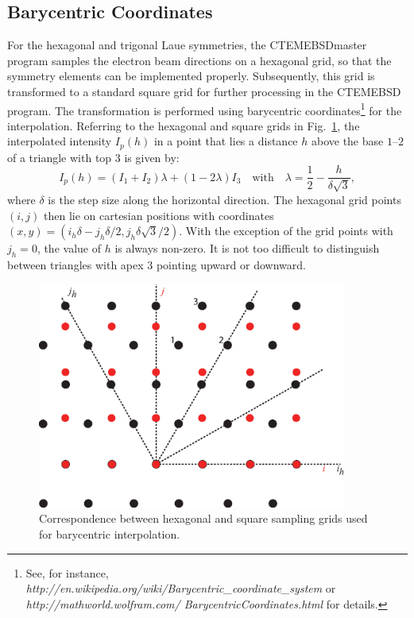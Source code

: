 \documentclass[DIV=calc, paper=letter, fontsize=11pt]{scrartcl}	 %
\begin{document}
\subsection{Barycentric Coordinates \label{sec:barycentric}}
For the hexagonal and trigonal Laue symmetries, the \textsf{CTEMEBSDmaster} program samples the electron beam directions on 
a hexagonal grid, so that the symmetry elements can be implemented properly.  Subsequently, this grid is transformed to a standard
square grid for further processing in the \textsf{CTEMEBSD} program.  The transformation is performed using barycentric coordinates\footnote{See, for
instance, \textit{http://en.wikipedia.org/wiki/Barycentric\_coordinate\_system} or \textit{http://mathworld.wolfram.com/ BarycentricCoordinates.html} for details.}
for the interpolation.  Referring to the hexagonal and square grids in Fig.~\ref{fig:bary}, 
the interpolated intensity $I_p(h)$ in a point that lies a 
distance $h$ above the base $1$--$2$ of a triangle with top $3$ is given by:
\[
	I_p(h) = (I_1+I_2)\lambda+(1-2\lambda) I_3\quad\text{with}\quad \lambda=\frac{1}{2} - \frac{h}{\delta\sqrt{3}},
\]
where $\delta$ is the step size along the horizontal direction.  The hexagonal grid points $(i,j)$ then 
lie on cartesian positions with coordinates $(x,y)=(i_h\delta-j_h\delta/2,j_h\delta\sqrt{3}/2)$.  With the exception of 
the grid points with $j_h=0$, the value of $h$ is always non-zero.  It is not too difficult to distinguish between
triangles with apex $3$ pointing upward or downward.

\begin{figure}[h]
\centering
\includegraphics[width=4in]{figs/bary}
\caption{Correspondence between hexagonal and square sampling grids used for barycentric interpolation.} \label{fig:bary}
\end{figure}
\end{document}

